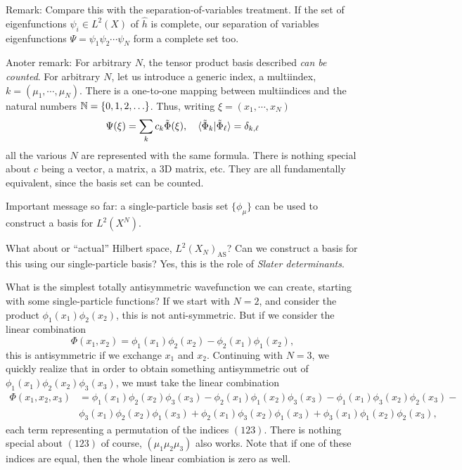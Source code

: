 \documentclass{report}
\theoremstyle{plain}
\theoremstyle{definition}
\begin{document}
Remark: Compare this with the separation-of-variables treatment. If
the set of eigenfunctions $\psi_i\in L^2(X)$ of $\hat{h}$ is complete,
our separation of variables eigenfunctions $\Psi =
\psi_1\psi_2\cdots\psi_N$ form a complete set too.

Anoter remark: For arbitrary $N$, the tensor product basis described
\emph{can be counted}. For arbitrary $N$, let us introduce a generic
index, a multiindex, $k = (\mu_1,\cdots,\mu_N)$. There is
a one-to-one mapping between multiindices and the natural
numbers $\mathbb{N} = \{0,1,2,\ldots\}$. Thus, writing $\xi = (x_1,\cdots,x_N)$
\begin{equation}
  \Psi(\xi) = \sum_k c_k \tilde{\Phi}(\xi), \quad
  \braket{\tilde{\Phi}_k|\tilde{\Phi}_\ell} = \delta_{k,\ell} 
\end{equation}
all the various $N$ are represented with the same formula. There is nothing
special about $c$ being a vector, a matrix, a 3D matrix, etc. They
are all fundamentally equivalent, since the basis set can be counted.

Important message so far: a single-particle basis set $\{\phi_\mu\}$
can be used to construct a basis for $L^2(X^N)$.

What about or ``actual'' Hilbert space, $L^2(X_N)_\text{AS}$? Can we
construct a basis for this using our single-particle basis? Yes, this
is the role of \emph{Slater determinants}.

What is the simplest totally antisymmetric wavefunction we can create,
starting with some single-particle functions?
If we start with $N=2$, and consider the product
$\phi_1(x_1)\phi_2(x_2)$, this is not anti-symmetric. But if we
consider the linear combination
\begin{equation}
  \Phi(x_1,x_2) = \phi_1(x_1)\phi_2(x_2) - \phi_2(x_1)\phi_1(x_2),
\end{equation}
this is antisymmetric if we exchange $x_1$ and $x_2$. Continuing with
$N=3$, we quickly realize that in order to obtain something
antisymmetric out of $\phi_1(x_1)\phi_2(x_2)\phi_3(x_3)$, we must take
the linear combination
\begin{equation}
  \begin{split}
  \Phi(x_1,x_2,x_3) &= \phi_1(x_1)\phi_2(x_2)\phi_3(x_3) -
  \phi_2(x_1)\phi_1(x_2)\phi_3(x_3) -
  \phi_1(x_1)\phi_3(x_2)\phi_2(x_3) -\\
&  \phi_3(x_1)\phi_2(x_2)\phi_1(x_3) +
  \phi_2(x_1)\phi_3(x_2)\phi_1(x_3) +
  \phi_3(x_1)\phi_1(x_2)\phi_2(x_3),
\end{split}
\end{equation}
each term representing a permutation of the indices $(123)$. There is
nothing special about $(123)$ of course, $(\mu_1\mu_2\mu_3)$ also
works. Note that if one of these indices are equal, then the whole
linear combiation is zero as well.
\end{document}

